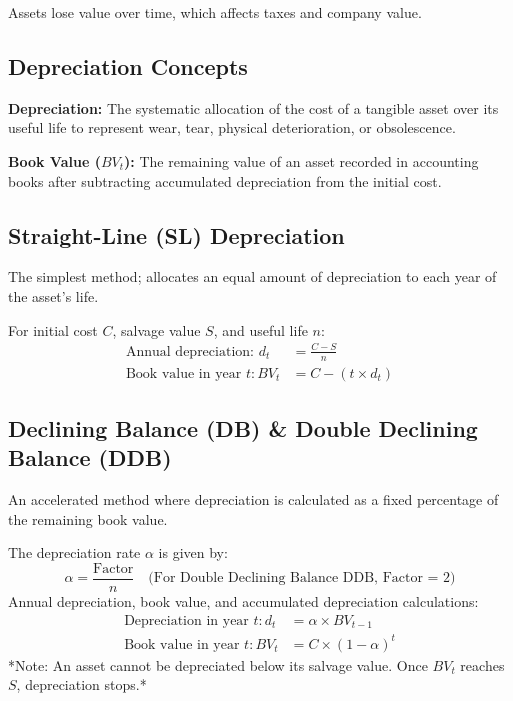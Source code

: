 \documentclass[12pt,a4paper]{article}
\begin{document}
Assets lose value over time, which affects taxes and company value.

\subsection{Depreciation Concepts}
\begin{tcolorbox}[defbox]
\textbf{Depreciation:} The systematic allocation of the cost of a tangible asset over its useful life to represent wear, tear, physical deterioration, or obsolescence.
\par\vspace{3pt}
\textbf{Book Value ($BV_t$):} The remaining value of an asset recorded in accounting books after subtracting accumulated depreciation from the initial cost.
\end{tcolorbox}

\subsection{Straight-Line (SL) Depreciation}
The simplest method; allocates an equal amount of depreciation to each year of the asset's life.
\begin{tcolorbox}[formulabox, title={\textbf{Straight-Line Formulas}}]
For initial cost $C$, salvage value $S$, and useful life $n$:
\begin{align}
  \text{Annual depreciation: } d_t &= \frac{C - S}{n} \\[4pt]
  \text{Book value in year } t: BV_t &= C - (t \times d_t)
\end{align}
\end{tcolorbox}

\subsection{Declining Balance (DB) \& Double Declining Balance (DDB)}
An accelerated method where depreciation is calculated as a fixed percentage of the remaining book value.
\begin{tcolorbox}[formulabox, title={\textbf{Declining Balance Formulas}}]
The depreciation rate $\alpha$ is given by:
\begin{equation}
  \alpha = \frac{\text{Factor}}{n} \quad \text{(For Double Declining Balance DDB, Factor = 2)}
\end{equation}
Annual depreciation, book value, and accumulated depreciation calculations:
\begin{align}
  \text{Depreciation in year } t: d_t &= \alpha \times BV_{t-1} \\[4pt]
  \text{Book value in year } t: BV_t &= C \times (1 - \alpha)^t
\end{align}
*Note: An asset cannot be depreciated below its salvage value. Once $BV_t$ reaches $S$, depreciation stops.*
\end{tcolorbox}
\end{document}
